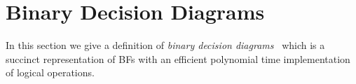 \documentclass[
  digital, %
  twoside, %
  table,   %
  nolof,     %
  nolot,     %
]{fithesis3}
\let\setbuilder\set
\newcommand{\simpleset}[1]{\{{#1}\}}
\renewcommand{\set}[1]{\normalexpandarg\IfSubStr{#1}{|}{\setbuilder{#1}}{\simpleset{#1}}}
\newtheorem{theorem}{Theorem}[chapter] %
\theoremstyle{definition}
\theoremstyle{remark}
\newcommand{\seman}[1]{\left\llbracket {#1} \right\rrbracket}
\newcommand{\substitute}[2]{\left[ \nicefrac{#2}{#1} \right]}
\begin{document}


\section{Binary Decision Diagrams}
In this section we give a definition of \emph{binary decision diagrams}~\cite{BDD} which is a succinct representation of BFs with an efficient polynomial time implementation of logical operations.
\end{document}
